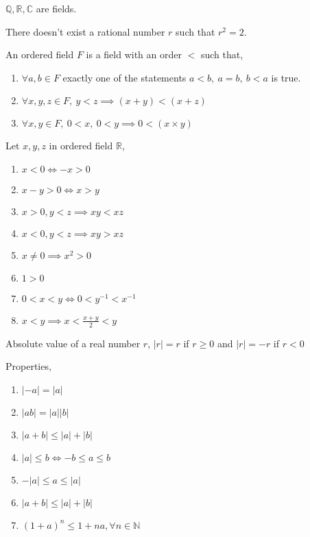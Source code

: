 	\begin{remark}
		$\mathbb{Q},\mathbb{R},\mathbb{C}$ are fields.
	\end{remark}

	\begin{theorem}
		There doesn't exist a rational number $r$ such that $r^2 = 2$.
	\end{theorem}

	\begin{axiom}[Order]
		An ordered field $F$ is a field with an order $<$ such that,
		\begin{enumerate}
			\item $\forall a,b \in F$ exactly one of the statements $a<b,\ a=b,\ b<a$ is true.
			\item $\forall x,y,z \in F,\ y<z \implies (x+y)<(x+z)$
			\item $\forall x,y \in F,\ 0 < x,\ 0 < y \implies 0 < (x \times y)$
		\end{enumerate}
	\end{axiom}

	\begin{remark} Let $x,y,z$ in ordered field $\mathbb{R}$,
		\begin{enumerate}
			\item $x < 0 \iff -x > 0$
			\item $x - y > 0 \iff x > y$
			\item $x > 0, y < z \implies xy < xz$
			\item $x < 0, y < z \implies xy > xz$
			\item $x \ne 0 \implies x^2 > 0$
			\item $1 > 0$
			\item $0 < x < y \iff 0 < y^{-1} < x^{-1}$
			\item $x < y \implies x < \frac{x+y}{2} < y$
		\end{enumerate}
	\end{remark}

	\begin{definition}
		Absolute value of a real number $r$, $|r| = r$ if $r \ge 0$ and $|r| = -r$ if $r < 0$
	\end{definition}

	\begin{remark}Properties,
		\begin{enumerate}
			\item $|-a| = |a|$
			\item $|ab| = |a||b|$
			\item $|a+b| \le |a|+|b|$
			\item $|a| \le b \iff -b \le a \le b$
			\item $-|a| \le a \le |a|$
			\item $|a+b| \le |a| + |b|$
			\item $(1+a)^n \le 1+na, \forall n \in \mathbb{N}$
		\end{enumerate}
	\end{remark}

